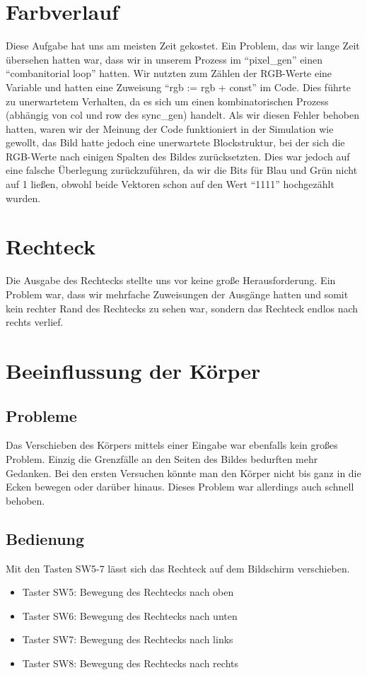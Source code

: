 \documentclass[parskip=full]{scrartcl}
\begin{document}
	\section{Farbverlauf}
		Diese Aufgabe hat uns am meisten Zeit gekostet. Ein Problem, das wir lange Zeit übersehen hatten war, dass wir in unserem Prozess im \enquote{pixel\_gen}  einen \enquote{combanitorial loop} hatten. Wir nutzten zum Zählen der RGB-Werte eine Variable und hatten eine Zuweisung \enquote{rgb := rgb + const} im Code. Dies führte zu unerwartetem Verhalten, da es sich um einen kombinatorischen Prozess (abhängig von col und row des sync\_gen) handelt.
		Als wir diesen Fehler behoben hatten, waren wir der Meinung der Code funktioniert in der Simulation wie gewollt, das Bild hatte jedoch eine unerwartete Blockstruktur, bei der sich die RGB-Werte nach einigen Spalten des Bildes zurücksetzten. Dies war jedoch auf eine falsche Überlegung zurückzuführen, da wir die Bits für Blau und Grün nicht auf 1 ließen, obwohl beide Vektoren schon auf den Wert \enquote{1111} hochgezählt wurden.
	\section{Rechteck}
		Die Ausgabe des Rechtecks stellte uns vor keine große Herausforderung. Ein Problem war, dass wir mehrfache Zuweisungen der Ausgänge hatten und somit kein rechter Rand des Rechtecks zu sehen war, sondern das Rechteck endlos nach rechts verlief.
	
	\section{Beeinflussung der Körper}
		\subsection{Probleme}
			Das Verschieben des Körpers mittels einer Eingabe war ebenfalls kein großes Problem. Einzig die Grenzfälle an den Seiten des Bildes bedurften mehr Gedanken. Bei den ersten Versuchen könnte man den Körper nicht bis ganz in die Ecken bewegen oder darüber hinaus. Dieses Problem war allerdings auch schnell behoben.
			
		\subsection{Bedienung}
			Mit den Tasten SW5-7 lässt sich das Rechteck auf dem Bildschirm verschieben.
			\begin{itemize}
				\item Taster SW5: Bewegung des Rechtecks nach oben
				\item Taster SW6: Bewegung des Rechtecks nach unten
				\item Taster SW7: Bewegung des Rechtecks nach links
				\item Taster SW8: Bewegung des Rechtecks nach rechts
			\end{itemize}
		
		
	
\end{document}
